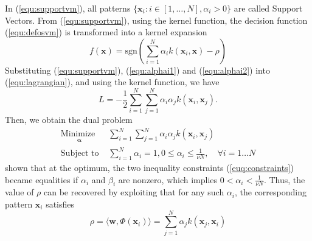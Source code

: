 \documentclass[conference]{IEEEtran}
\begin{document}
In (\ref{equ:supportvm}), all patterns $\{\mathbf{x}_i:i\in[1,\ldots,N], \alpha_i>0\}$ are called Support Vectors. From (\ref{equ:supportvm}), using the kernel function, the decision function (\ref{equ:defosvm}) is transformed into a kernel expansion 
\begin{equation}
\label{equ:defosvmker}
f(\mathbf{x})=\text{sgn}\left(\sum_{i=1}^N\alpha_i k(\mathbf{x}_i, \mathbf{x})- \rho\right)
\end{equation}
Substituting (\ref{equ:supportvm}), (\ref{equ:alphai1}) and (\ref{equ:alphai2}) into (\ref{equ:lagrangian}), and using the kernel function, we have 
\begin{equation}
\label{equ:lagrangianalpha}
L=-\frac{1}{2}\sum_{i=1}^N\sum_{j=1}^N \alpha_i\alpha_j k(\mathbf{x}_i, \mathbf{x}_j).
\end{equation}
Then, we obtain the dual problem
\begin{subequations}\label{euq:ocsvmker}
\begin{align}
\underset{
	\begin{array}{c}
		 \mathbf{\alpha}
	\end{array}}{\text{Minimize }} & \sum_{i=1}^N\sum_{j=1}^N \alpha_i\alpha_j k(\mathbf{x}_i, \mathbf{x}_j)\\
\text{Subject to } & \sum_{i=1}^N\alpha_i=1 ,  0\leq \alpha_i\leq \frac{1}{\nu N}, \quad \forall i=1\ldots N
\end{align}
\end{subequations}
\cite{scholkopf2001estimating} shown that at the optimum, the two inequality constraints (\ref{euq:constraints}) 
became equalities if $\alpha_i$ and $\beta_i$ are nonzero, which implies $0<\alpha_i<\frac{1}{\nu N}$. Thus, the value of $\rho$
can be recovered by exploiting that for any such $\alpha_i$, the corresponding pattern $ \mathbf{x}_i$ satisfies
\begin{equation}
\label{equ:rho}
\rho=\langle\mathbf{w},\Phi(\mathbf{x}_i)\rangle=\sum_{j=1}^N\alpha_j k(\mathbf{x}_j, \mathbf{x}_i)
\end{equation}
\end{document}
